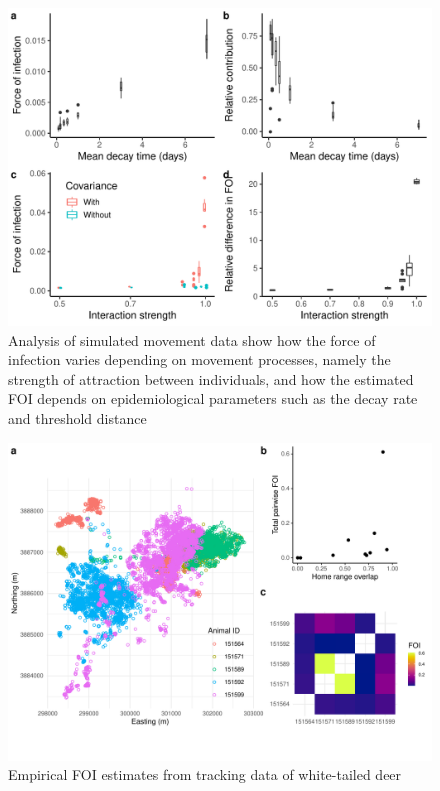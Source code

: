 \documentclass[letterpaper]{article}
\begin{document}
\begin{figure}
    \includegraphics[width=\textwidth]{figures/sim_results.pdf}
    \caption{Analysis of simulated movement data show how the force of infection varies depending on movement processes, namely the strength of attraction between individuals, and how the estimated FOI depends on epidemiological parameters such as the decay rate and threshold distance}
	\label{fig:simresults}
\end{figure}

\begin{figure}
     \includegraphics[width=\textwidth]{figures/deer_results.pdf}
    \caption{Empirical FOI estimates from tracking data of white-tailed deer}
	\label{fig:empiricalres}
\end{figure}
\end{document}
